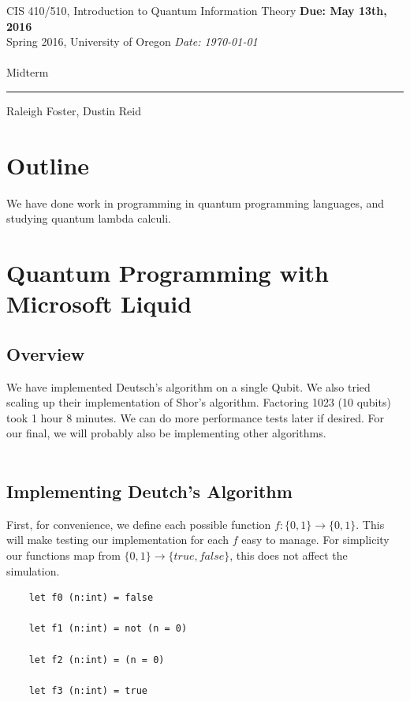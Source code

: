 \documentclass{article}
\newcommand{\shortbar}{\begin{center}\rule{5ex}{0.1pt}\end{center}}
\newcommand{\courseNumber}{CIS 410/510}
\newcommand{\courseTitle}{Introduction to Quantum Information Theory}
\newcommand{\semester}{Spring 2016}
\theoremstyle{plain}
\theoremstyle{definition}
\theoremstyle{remark}
\newenvironment{solution}[1]{\medskip\noindent{\bf Solution #1.~}}{\shortbar}
\newcommand{\solutions}[3]{
\vspace{-2ex}
\begin{center}
{\small  \courseNumber, \courseTitle
\hfill {\large \bf {Due: #1} }\\
\semester, University of Oregon \hfill
{\em Date: #3}}\\
\vspace{-1ex}
\hrulefill\\
\vspace{4ex}
{\Large #2}\\
\vspace{2ex}
\end{center}
\shortbar
\vspace{3ex}
}
\begin{document}
\solutions{May 13th, 2016}{Midterm}{\today}
%
%


$$$$Raleigh Foster, Dustin Reid$$$$

\section{Outline}

We have done work in programming in quantum programming languages,
and studying quantum lambda calculi.



\section{Quantum Programming with Microsoft Liquid}

\subsection{Overview}
We have implemented Deutsch's algorithm on a single Qubit. We also tried scaling
up their implementation of Shor's algorithm. Factoring 1023 (10 qubits) took 1
hour 8 minutes. We can do more performance tests later if desired. For our final,
we will probably also be implementing other algorithms. \\ \\

\subsection{Implementing Deutch's Algorithm}
First, for convenience, we define each possible function $f : \{0,1\} \rightarrow \{0,1\}$.
This will make testing our implementation for each $f$ easy to manage. For simplicity our functions
map from $\{0,1\} \rightarrow \{true,false\}$, this does not affect the simulation.

\begin{lstlisting}
	let f0 (n:int) = false

    let f1 (n:int) = not (n = 0)

    let f2 (n:int) = (n = 0)

    let f3 (n:int) = true
\end{lstlisting}
\end{document}
